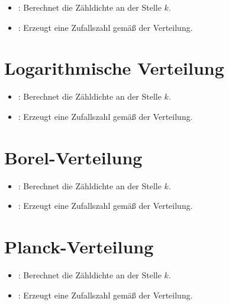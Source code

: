 \begin{itemize}

\item
{}:
Berechnet die Zähldichte an der Stelle $k$.

\item
{}:
Erzeugt eine Zufallszahl gemäß der Verteilung.

\end{itemize}



\section{Logarithmische Verteilung}

\begin{itemize}

\item
{}:
Berechnet die Zähldichte an der Stelle $k$.


\item
{}:
Erzeugt eine Zufallszahl gemäß der Verteilung.

\end{itemize}



\section{Borel-Verteilung}

\begin{itemize}

\item
{}:
Berechnet die Zähldichte an der Stelle $k$.


\item
{}:
Erzeugt eine Zufallszahl gemäß der Verteilung.

\end{itemize}



\section{Planck-Verteilung}

\begin{itemize}

\item
{}:
Berechnet die Zähldichte an der Stelle $k$.

\item
{}:
Erzeugt eine Zufallszahl gemäß der Verteilung.

\end{itemize}



